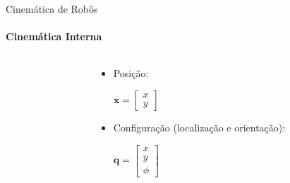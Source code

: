 \documentclass{beamer}
\begin{document}
\begin{frame}{Cinemática de Robôs}
    \framesubtitle{Cinemática Interna}
    \begin{columns}
        \begin{column}[c]{0.5\textwidth}
            \centering
            
        \end{column}
        \begin{column}[c]{0.5\textwidth}
            \centering
            \begin{itemize}
                \item Posição:
                      \newline

                      $\mathbf{x} = \begin{bmatrix}
                              x \\
                              y
                          \end{bmatrix}$
                      \newline

                \item Configuração (localização e orientação):
                      \newline

                      $\mathbf{q} =
                          \begin{bmatrix}
                              x \\
                              y \\
                              \phi
                          \end{bmatrix}$
            \end{itemize}
        \end{column}
    \end{columns}
\end{frame}
\end{document}
